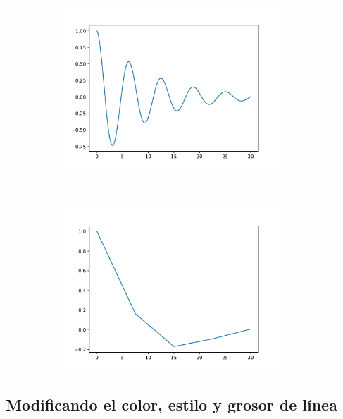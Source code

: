 \begin{figure}[h!]
\begin{subfigure}{0.48\textwidth}
\centering
\includegraphics[width=0.9\textwidth]{img/ch03/plot_function_more_points.pdf}
\label{fig:plot_function_more_points}
\end{subfigure}~
\begin{subfigure}{0.48\textwidth}
\centering
\includegraphics[width=0.9\textwidth]{img/ch03/plot_function_less_points.pdf}
\label{fig:plot_function_less_points}
\end{subfigure}

\caption{}
\end{figure}


\subsection{Modificando el color, estilo y grosor de línea}

